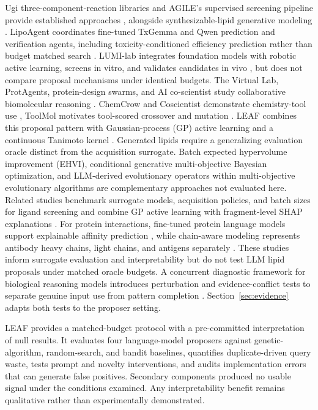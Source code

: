 \documentclass[11pt]{article}
\begin{document}
Ugi three-component-reaction libraries and AGILE's supervised screening pipeline provide established approaches \citep{xu2023ugi,xu2024agile}, alongside synthesizable-lipid generative modeling \citep{zhu2024generative}. LipoAgent coordinates fine-tuned TxGemma and Qwen prediction and verification agents, including toxicity-conditioned efficiency prediction rather than budget matched search \citep{li2025lipoagent}. LUMI-lab integrates foundation models with robotic active learning, screens in vitro, and validates candidates in vivo \citep{lumilab2026}, but does not compare proposal mechanisms under identical budgets.
The Virtual Lab, ProtAgents, protein-design swarms, and AI co-scientist study collaborative biomolecular reasoning \citep{swanson2025virtuallab,protagents2025,swarmdesign2025,gottweis2026}. ChemCrow and Coscientist demonstrate chemistry-tool use \citep{bran2023chemcrow,boiko2023coscientist}, ToolMol motivates tool-scored crossover and mutation \citep{toolmol2026}. LEAF combines this proposal pattern with Gaussian-process (GP) active learning and a continuous Tanimoto kernel \citep{gessner2024,srinivas2009,rasmussen2006,settles2012}. Generated lipids require a generalizing evaluation oracle distinct from the acquisition surrogate. Batch expected hypervolume improvement (EHVI), conditional generative multi-objective Bayesian optimization, and LLM-derived evolutionary operators within multi-objective evolutionary algorithms are complementary approaches not evaluated here.
Related studies benchmark surrogate models, acquisition policies, and batch sizes for ligand screening \citep{gorantla2024benchmarking} and combine GP active learning with fragment-level SHAP explanations \citep{srivastava2026explainable}. For protein interactions, fine-tuned protein language models support explainable affinity prediction \citep{singh2026explainable}, while chain-aware modeling represents antibody heavy chains, light chains, and antigens separately \citep{singh2026antibody}. These studies inform surrogate evaluation and interpretability but do not test LLM lipid proposals under matched oracle budgets. A concurrent diagnostic framework for biological reasoning models introduces perturbation and evidence-conflict tests to separate genuine input use from pattern completion \citep{fang2026bioreasoninputs}. Section~\ref{sec:evidence} adapts both tests to the proposer setting.

LEAF provides a matched-budget protocol with a pre-committed interpretation of null results. It evaluates four language-model proposers against genetic-algorithm, random-search, and bandit baselines, quantifies duplicate-driven query waste, tests prompt and novelty interventions, and audits implementation errors that can generate false positives. Secondary components produced no usable signal under the conditions examined. Any interpretability benefit remains qualitative rather than experimentally demonstrated.
\end{document}
